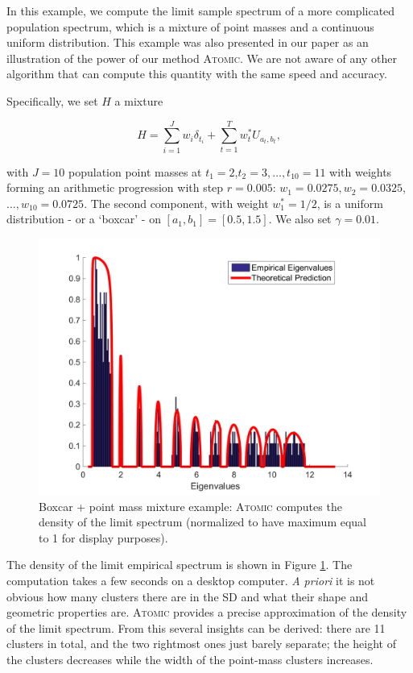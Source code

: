 \documentclass[english,11pt]{article} %
\begin{document}
In this example, we compute the limit sample spectrum of a more complicated population spectrum, which is a mixture of point masses and a continuous uniform distribution. This example was also presented in our paper \cite{dobriban2015precise} as an illustration of the power of our method \textsc{Atomic}. We are not aware of any other algorithm that can compute this quantity with the same speed and accuracy.

Specifically, we set $H$ a mixture

\begin{equation*}
\label{uniform_atomic}
H = \sum_{i=1}^{J} w_i \delta_{t_i} + \sum_{t=1}^{T} w^*_t U_{a_t,b_t} ,
\end{equation*}

with $J=10$ population point masses at $t_1=2$,$t_2=3,\ldots,t_{10}=11$ with weights forming an arithmetic progression with step $r = 0.005$: $w_1=0.0275, w_2=0.0325$,$\ldots, w_{10}=0.0725$. The second component, with weight $w^*_1=1/2$, is a uniform distribution - or a `boxcar' - on $[a_1,b_1]=[0.5,1.5]$.  We also set $\gamma=0.01$.


\begin{figure}
\centering
  \includegraphics[scale=0.45]{"../Experiments/Examples/Illustration_mixture_3"}
\caption{Boxcar + point mass mixture example: \textsc{Atomic} computes  the density of the limit spectrum (normalized to have maximum equal to 1 for display purposes).}
\label{example_2}
\end{figure}

The density of the limit empirical spectrum is shown in Figure \ref{example_2}. The computation takes a few seconds on a desktop computer. \emph{A priori} it is not obvious how many clusters there are in the SD and what their shape and geometric properties are. \textsc{Atomic} provides a precise approximation of the density of the limit spectrum. From this several insights can be derived: there are 11 clusters in total, and the two rightmost ones just barely separate; the height of the clusters decreases while the width of the point-mass clusters increases.
\end{document}
